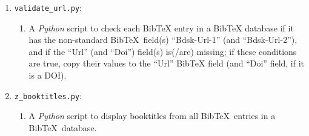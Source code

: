 \begin{enumerate}
\begin{enumerate}
	\end{enumerate}
\item {\tt validate\_url.py}: \vspace{-0.3cm}
	\begin{enumerate} \itemsep -2pt
	\item A {\it Python} script to check each BibTeX entry in a BibTeX database if it has the non-standard {\sc Bib}\TeX\ field(s) ``Bdsk-Url-1'' (and ``Bdsk-Url-2''), and if the ``Url'' (and ``Doi'') field(s) is(/are) missing; if these conditions are true, copy their values to the ``Url'' BibTeX field (and ``Doi'' field, if it is a DOI).
	\end{enumerate}
\item {\tt z\_booktitles.py}: \vspace{-0.3cm}
	\begin{enumerate} \itemsep -2pt
	\item A {\it Python} script to display booktitles from all {\sc Bib}\TeX\ entries in a {\sc Bib}\TeX\ database.
	\end{enumerate}
\end{enumerate}

























